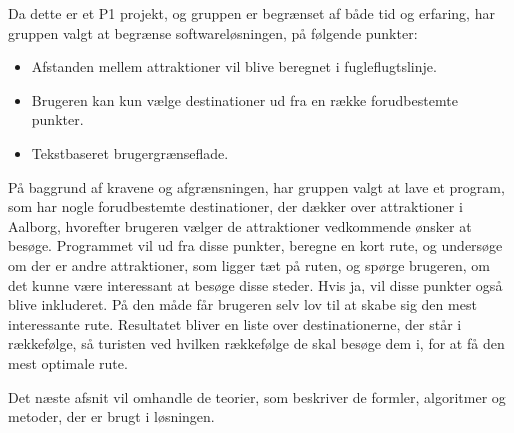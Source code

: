 Da dette er et P1 projekt, og gruppen er begrænset af både tid og erfaring, har gruppen valgt at begrænse softwareløsningen, på følgende punkter: 
\begin{itemize}
	\item Afstanden mellem attraktioner vil blive beregnet i fugleflugtslinje.
	\item Brugeren kan kun vælge destinationer ud fra en række forudbestemte punkter.
	\item Tekstbaseret brugergrænseflade.
\end{itemize}

På baggrund af kravene og afgrænsningen, har gruppen valgt at lave et program, som har nogle forudbestemte destinationer, der dækker over attraktioner i Aalborg, hvorefter brugeren vælger de attraktioner vedkommende ønsker at besøge. Programmet vil ud fra disse punkter, beregne en kort rute, og undersøge om der er andre attraktioner, som ligger tæt på ruten, og spørge brugeren, om det kunne være interessant at besøge disse steder. Hvis ja, vil disse punkter også blive inkluderet. På den måde får brugeren selv lov til at skabe sig den mest interessante rute. Resultatet bliver en liste over destinationerne, der står i rækkefølge, så turisten ved hvilken rækkefølge de skal besøge dem i, for at få den mest optimale rute.\newline

Det næste afsnit vil omhandle de teorier, som beskriver de formler, algoritmer og metoder, der er brugt i løsningen.
